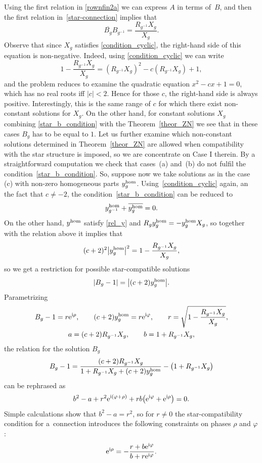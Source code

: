 \documentclass[pdftex]{sigma}
\numberwithin{equation}{section}
\begin{document}
Using the first relation in \eqref{rownfin2a} we can express $A$ in terms of~$B$, and then the first relation in~\eqref{star-connection} implies that
\begin{equation}\label{star_b_condition}
\overline{B_g}B_{g^{-1}}=\frac{R_{g^{-1}}X_g}{X_g}.
\end{equation}
Observe that since $X_g$ satisfies \eqref{condition_cyclic}, the right-hand side of this equation is non-negative. Indeed, using \eqref{condition_cyclic} we can write
\begin{equation*}
1-\frac{R_{g^{-1}}X_g}{X_g}=(R_{g^{-1}}X_g)^2-c(R_{g^{-1}}X_g)+1,
\end{equation*}
and the problem reduces to examine the quadratic equation $x^2-cx+1=0$, which has no real roots iff $|c|<2$. Hence for those $c$, the right-hand side is always positive. Interestingly, this is the same range of $c$ for which there exist non-constant solutions for $X_g$. On the other hand, for constant solutions $X_g$ combining \eqref{star_b_condition} with the Theorem~\ref{theor_ZN} we see that in these cases $B_g$ has to be equal to $1$. Let us further examine which non-constant solutions determined in Theorem~\ref{theor_ZN} are allowed when compatibility with the star structure is imposed, so we are concentrate on Case I therein. By a straightforward computation we check that cases~(a) and~(b) do not fulfil the condition~\eqref{star_b_condition}. So, suppose now we take solutions as in the case (c) with non-zero homogeneous parts $y_g^{{\rm hom}}$. Using~\ref{condition_cyclic} again, an the fact that $c\neq-2$, the condition~\eqref{star_b_condition} can be reduced to
\[ y_{g^{-1}}^{\rm hom}+\overline{y_g^{\rm hom}}=0.\]
On the other hand, $y^{{\rm hom}}$ satisfy \eqref{rel_y} and $R_gy_g^{\rm hom}=-y_g^{\rm hom}X_g$, so together with the relation above it implies that
\[ (c+2)^2\big|y_g^{\rm hom}\big|^2=1-\frac{R_{g^{-1}}X_g}{X_g},\]
so we get a restriction for possible star-compatible solutions
\[ |B_g-1|=\big|(c+2)y_g^{\rm hom}\big|.\]
Parametrizing
\begin{gather*}
B_g-1=r{\rm e}^{{\rm i}\rho}, \qquad (c+2)y_g^{\rm hom}=r{\rm e}^{{\rm i}\varphi}, \qquad r=\sqrt{1-\frac{R_{g^{-1}}X_g}{X_g}},\\
 a=(c+2)R_{g^{-1}}X_g, \qquad b=1+R_{g^{-1}}X_g,
\end{gather*}
the relation for the solution $B_g$
\[ B_g-1=\frac{(c+2)R_{g^{-1}}X_g}{1+R_{g^{-1}}X_g+(c+2)y_g^{\rm hom}}-\big(1+R_{g^{-1}}X_g\big)\]
can be rephrased as
\[ b^2-a+r^2{\rm e}^{{\rm i}(\varphi+\rho)}+rb\big({\rm e}^{{\rm i}\varphi}+{\rm e}^{{\rm i}\rho}\big)=0.\]
Simple calculations show that $b^2-a=r^2$, so for $r\neq 0$ the star-compatibility condition for a~connection introduces the following constraints on phases $\rho$ and $\varphi$:
\[ {\rm e}^{{\rm i}\rho}=-\frac{r+b{\rm e}^{{\rm i}\varphi}}{b+r{\rm e}^{{\rm i}\varphi}}.\]
\end{document}
